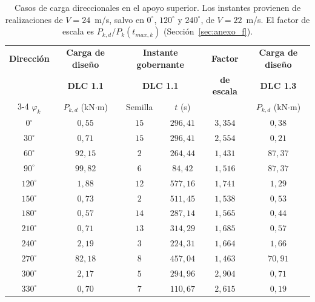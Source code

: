 \begin{table}[H]
    \centering
    \caption[Casos de carga direccionales en el apoyo superior.]{Casos de carga direccionales en el apoyo superior. Los instantes provienen de realizaciones de $V = 24$~m/s, salvo en $0^\circ$, $120^\circ$ y $240^\circ$, de $V = 22$~m/s. El factor de escala es $P_{k,d}/P_k(t_{max,k})$ (Sección~\ref{sec:anexo_f}).}
    \label{tab:casos_direccionales}
    \begin{tabular}{cccccc}
        \hline
        \textbf{Dirección} & \textbf{Carga de diseño} & \multicolumn{2}{c}{\textbf{Instante gobernante}} & \textbf{Factor} & \textbf{Carga de diseño} \\
        & \textbf{DLC 1.1} & \multicolumn{2}{c}{\textbf{DLC 1.1}} & \textbf{de escala} & \textbf{DLC 1.3} \\
        \cline{3-4}
        $\varphi_k$ & $P_{k,d}$ (kN$\cdot$m) & Semilla & $t$ (s) & & $P_{k,d}$ (kN$\cdot$m) \\
        \hline
        $0^\circ$   & $0{,}55$  & $15$ & $296{,}41$ & $3{,}354$ & $0{,}38$ \\
        $30^\circ$  & $0{,}71$  & $15$ & $296{,}41$ & $2{,}554$ & $0{,}21$ \\
        $60^\circ$  & $92{,}15$ & $2$  & $264{,}44$ & $1{,}431$ & $87{,}37$ \\
        $90^\circ$  & $99{,}82$ & $6$  & $84{,}42$  & $1{,}516$ & $87{,}37$ \\
        $120^\circ$ & $1{,}88$  & $12$ & $577{,}16$ & $1{,}741$ & $1{,}29$ \\
        $150^\circ$ & $0{,}73$  & $2$  & $511{,}45$ & $1{,}538$ & $0{,}53$ \\
        $180^\circ$ & $0{,}57$  & $14$ & $287{,}14$ & $1{,}565$ & $0{,}44$ \\
        $210^\circ$ & $0{,}71$  & $13$ & $314{,}29$ & $1{,}685$ & $0{,}57$ \\
        $240^\circ$ & $2{,}19$  & $3$  & $224{,}31$ & $1{,}664$ & $1{,}66$ \\
        $270^\circ$ & $82{,}18$ & $8$  & $457{,}04$ & $1{,}463$ & $70{,}91$ \\
        $300^\circ$ & $2{,}17$  & $5$  & $294{,}96$ & $2{,}904$ & $0{,}71$ \\
        $330^\circ$ & $0{,}70$  & $7$  & $110{,}67$ & $2{,}615$ & $0{,}19$ \\
        \hline
    \end{tabular}
\end{table}

